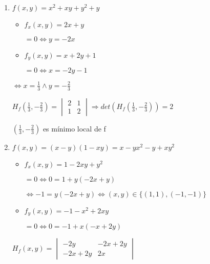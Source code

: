 \documentclass[../practica_06.tex]{subfiles}
\begin{document}
    \begin{enumerate}
        \item $f(x,y) = x^2 + xy + y^2 + y$
        
            \begin{itemize}
                \item $f_x(x,y) = 2x + y $

                    $= 0 \Leftrightarrow y = -2x$

                \item $f_y(x,y) = x + 2y + 1 $

                    $= 0 \Leftrightarrow x = -2y -1$

            \end{itemize}

            $\Leftrightarrow x = \frac{1}{3} \wedge y = -\frac{2}{3}$

            $H_f(\frac{1}{3}, -\frac{2}{3}) = \begin{vmatrix}
                2 & 1 \\
                1 & 2
            \end{vmatrix} \Rightarrow det(H_f(\frac{1}{3}, -\frac{2}{3})) = 2$

            $(\frac{1}{3}, -\frac{2}{3})$ es mínimo local de f

        \item $f(x,y) = (x-y)(1-xy) = x - yx^2 - y + xy^2$
        
            \begin{itemize}
                \item $f_x(x,y) = 1 - 2xy + y^2 $
                
                    $ = 0 \Leftrightarrow 0 = 1 + y(-2x + y) $

                    $\Leftrightarrow -1 = y(-2x + y) \Leftrightarrow (x,y) \in \{(1,1),(-1,-1)\}$

                \item $f_y(x,y) = -1 - x^2 + 2xy $
                
                    $ = 0 \Leftrightarrow 0 = -1 + x(-x + 2y)$

            \end{itemize}

            $H_f(x,y) = \begin{vmatrix}
                -2y & -2x + 2y \\
                -2x + 2y & 2x
            \end{vmatrix}$
        

\end{enumerate}
\end{document}

